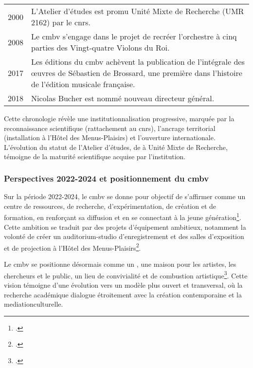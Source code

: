 \begin{longtable}{p{2cm} p{13.5cm}}
	2000 & L'Atelier d'études est promu Unité Mixte de Recherche (UMR 2162) par le \gls{cnrs}. \\
	
	2008 & Le \gls{cmbv} s'engage dans le projet de recréer l'orchestre à cinq parties \textquote{à la française} des Vingt-quatre Violons du Roi. \\
	
	2017 & Les éditions du \gls{cmbv} achèvent la publication de l'intégrale des œuvres de Sébastien de Brossard, une première dans l'histoire de l'édition musicale française. \\
	
	2018 & Nicolas Bucher est nommé nouveau directeur général. \\
\end{longtable}

Cette chronologie révèle une \gls{institutionnalisation} progressive, marquée par la reconnaissance scientifique (rattachement au \gls{cnrs}), l'ancrage territorial (installation à l'Hôtel des Menus-Plaisirs) et l'ouverture internationale. L'évolution du statut de l'Atelier d'études, de  à Unité Mixte de Recherche, témoigne de la maturité scientifique acquise par l'institution.

\subsubsection{Perspectives 2022-2024 et positionnement du \gls{cmbv}}

Sur la période 2022-2024, le \gls{cmbv} se donne pour objectif de s'affirmer comme un centre de ressources, de recherche, d'expérimentation, de création et de formation, en renforçant sa diffusion et en se connectant à la jeune génération\footcite{centredemusiquebaroquedeversaillesProjetEtablissement2022}. Cette ambition se traduit par des projets d'équipement ambitieux, notamment la volonté de créer un auditorium-studio d'enregistrement et des salles d'exposition et de projection à l'Hôtel des Menus-Plaisirs\footcite{centredemusiquebaroquedeversaillesProjetEtablissement2022}.

Le \gls{cmbv} se positionne désormais comme un , une maison pour les artistes, les chercheurs et le public, un lieu de convivialité et de combustion artistique\footcite{centredemusiquebaroquedeversaillesProjetEtablissement2022}. Cette vision témoigne d'une évolution vers un modèle plus ouvert et transversal, où la recherche académique dialogue étroitement avec la création contemporaine et la \gls{mediationculturelle}.

